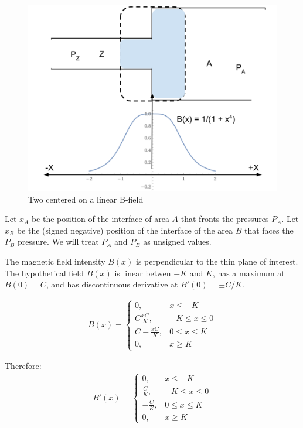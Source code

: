 \documentclass{asme2ej}
\begin{document}
\begin{figure}
\centerline{\includegraphics[width=6in]{figure/ThoughtExperimentCentered.png}}
\caption{Two centered on a  linear B-field}
\label{fig:centeredthought}
\end{figure}

Let $x_A$ be the position of the interface of area $A$ that fronts the pressures $P_A$.
Let $x_B$ be the (signed negative) position of the interface of the area $B$ that
faces the $P_B$ pressure. We will treat $P_A$ and $P_B$ as unsigned values.

The magnetic field intensity $B(x)$ is perpendicular to the thin plane of interest.
The hypothetical field $B(x)$ is linear betwen $-K$ and $K$, has a maximum at $B(0) = C$,
and has discontinuous derivative at $B'(0) = \pm C/K$.

\begin{align}
  B(x) =
    \begin{cases}
      0  , & x \leq -K \\
      C  \frac{xC}{K}  , & -K \leq x \leq 0  \\
      C - \frac{xC}{K}  , & 0 \leq x \leq K \\
      0  , & x \geq K
    \end{cases}
\end{align}

Therefore:
\begin{align}
  B'(x) =
    \begin{cases}
      0  , & x \leq -K \\
      \frac{C}{K}  , & -K \leq x \leq 0  \\
      -\frac{C}{K}  , & 0 \leq x \leq K \\
      0  , & x \geq K
    \end{cases}
\end{align}
\end{document}
